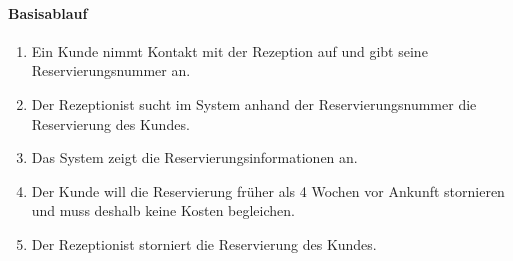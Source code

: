 \paragraph{Basisablauf}
\begin{enumerate}
\item Ein \Gls{Kunde} nimmt Kontakt mit der \Gls{Rezeption} auf und gibt seine \Gls{Reservierungsnummer} an.
\item Der \Gls{Rezeptionist} sucht im System anhand der \Gls{Reservierungsnummer} die \Gls{Reservierung} des \Glspl{Kunde}.
\item Das System zeigt die Reservierungsinformationen an.
\item Der \Gls{Kunde} will die \Gls{Reservierung} früher als 4 Wochen vor Ankunft stornieren und muss deshalb keine Kosten begleichen.
\item Der \Gls{Rezeptionist} storniert die Reservierung des \Glspl{Kunde}.
\end{enumerate}

